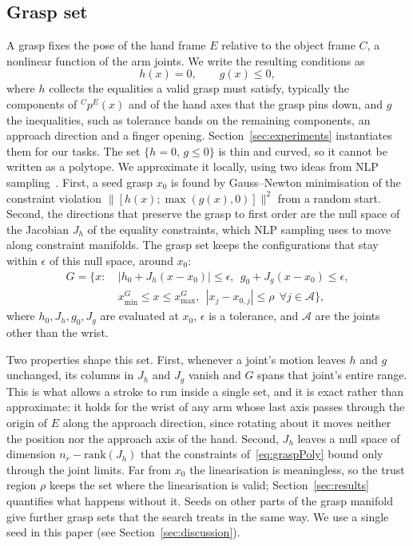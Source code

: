 \subsection{Grasp set}
\label{sec:method:grasp}
A grasp fixes the pose of the hand frame $E$ relative to the object frame $C$,
a nonlinear function of the arm joints. We write the resulting conditions as
\begin{equation}
  h(x)=0,\qquad g(x)\le 0,
  \label{eq:grasp_hg}
\end{equation}
where $h$ collects the equalities a valid grasp must satisfy, typically the
components of ${}^{C}p^{E}(x)$ and of the hand axes that the grasp pins down,
and $g$ the inequalities, such as tolerance bands on the remaining components,
an approach direction and a finger opening.
Section~\ref{sec:experiments} instantiates them for our tasks. The set
$\{h=0,\,g\le0\}$ is thin and curved, so it cannot be written as a polytope.
We approximate it locally, using two ideas from NLP
sampling~\cite{toussaint2024nlp}. First, a seed grasp $x_0$ is found by
Gauss--Newton minimisation of the constraint violation
$\|[h(x);\max(g(x),0)]\|^2$ from a random start. Second, the directions that
preserve the grasp to first order are the null space of the Jacobian $J_h$ of
the equality constraints, which NLP sampling uses to move along constraint
manifolds. The grasp set keeps the configurations that stay within $\epsilon$
of this null space, around $x_0$:
\begin{equation}
\begin{aligned}
G=\{x:\ & |h_0+J_h(x-x_0)|\le\epsilon,\ \ g_0+J_g(x-x_0)\le\epsilon,\\
        & x^{G}_{\min}\le x\le x^{G}_{\max},\ \ |x_j-x_{0,j}|\le\rho\ \ \forall j\in\mathcal{A}\},
\end{aligned}
\label{eq:graspPoly}
\end{equation}
where $h_0,J_h,g_0,J_g$ are evaluated at $x_0$, $\epsilon$ is a tolerance, and
$\mathcal{A}$ are the joints other than the wrist.

Two properties shape this set. First, whenever a joint's motion leaves $h$ and
$g$ unchanged, its columns in $J_h$ and $J_g$ vanish and $G$ spans that joint's
entire range. This is what allows a stroke to run inside a single set, and it
is exact rather than approximate: it holds for the wrist of any arm whose last
axis passes through the origin of $E$ along the approach direction, since
rotating about it moves neither the position nor the approach axis of the hand.
Second, $J_h$ leaves a null space of dimension $n_r-\mathrm{rank}(J_h)$ that the
constraints of~\eqref{eq:graspPoly} bound only through the joint limits. Far
from $x_0$ the linearisation is meaningless, so the trust region $\rho$ keeps
the set where the linearisation is valid; Section~\ref{sec:results} quantifies
what happens without it. Seeds on other parts of the grasp manifold give
further grasp sets that the search treats in the same way. We use a single
seed in this paper (see Section~\ref{sec:discussion}).

